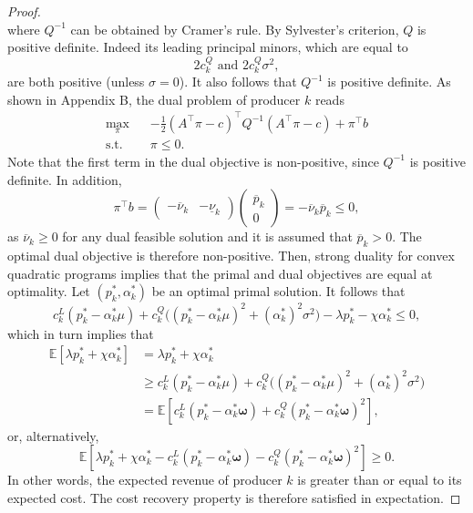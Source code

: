 \documentclass{article}
\begin{document}
\begin{proof}
\begin{equation*}
\end{equation*}
where $Q^{-1}$ can be obtained by Cramer's rule. By Sylvester's criterion, $Q$ is positive definite. Indeed its leading principal minors, which are equal to 
\begin{equation*}
2c_k^Q \mbox{ and } 2c_k^Q\sigma^2,
\end{equation*}
are both positive (unless $\sigma = 0$). It also follows that $Q^{-1}$ is positive definite. As shown in Appendix B, the dual problem of producer $k$ reads 
\begin{align*}
\underset{\pi}{\max} \hspace{10pt} & -\frac{1}{2}(A^\top \pi -c)^\top Q^{-1} (A^\top \pi -c) + \pi^\top b\\
\mbox{s.t. } & \pi \le 0.
\end{align*}
Note that the first term in the dual objective is non-positive, since $Q^{-1}$ is positive definite. In addition,
\begin{equation*}
\pi^\top b = \begin{pmatrix}-\overline{\nu}_k & -\underline{\nu}_k \end{pmatrix}\begin{pmatrix} \overline{p}_k\\0\end{pmatrix} = -\overline{\nu}_k \overline{p}_k \le 0,
\end{equation*}
as $\overline{\nu}_k \ge 0$ for any dual feasible solution and it is assumed that $\overline{p}_k > 0$. The optimal dual objective is therefore non-positive. Then, strong duality for convex quadratic programs \cite{Dorn1960} implies that the primal and dual objectives are equal at optimality. Let $(p_k^*, \alpha_k^*)$ be an optimal primal solution. It follows that
\begin{equation*}
c_k^L(p_k^* - \alpha_k^* \mu) + c_k^Q \big((p_k^* - \alpha_k^* \mu)^2 + (\alpha_k^*)^2 \sigma^2\big) - \lambda p_k^* - \chi \alpha_k^* \le 0,
\end{equation*}
which in turn implies that
\begin{align*}
\mathbb{E}[\lambda p_k^* + \chi \alpha_k^*] &= \lambda p_k^* + \chi \alpha_k^*\\
&\ge c_k^L(p_k^* - \alpha_k^* \mu) + c_k^Q \big((p_k^* - \alpha_k^* \mu)^2 + (\alpha_k^*)^2 \sigma^2\big)\\ 
&= \mathbb{E}[c_k^L(p_k^* - \alpha_k^* \boldsymbol{\omega}) + c_k^Q (p_k^* - \alpha_k^* \boldsymbol{\omega})^2],
\end{align*}
or, alternatively,
\begin{equation*}
\mathbb{E}[\lambda p_k^* + \chi \alpha_k^* - c_k^L(p_k^* - \alpha_k^* \boldsymbol{\omega}) - c_k^Q (p_k^* - \alpha_k^* \boldsymbol{\omega})^2] \ge 0.
\end{equation*}
In other words, the expected revenue of producer $k$ is greater than or equal to its expected cost. The cost recovery property is therefore satisfied in expectation.


\end{proof}
\end{document}
